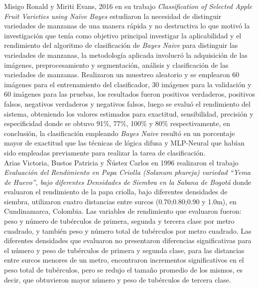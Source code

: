 Misigo Ronald y Miriti Evans, 2016 en su trabajo \textit{Classification of Selected Apple Fruit Varieties using Naïve Bayes} estudiaron la necesidad de distinguir variedades de manzanas de una manera rápida y no destructiva lo que motivó la investigación  que tenía como objetivo principal investigar la aplicabilidad y el rendimiento del algoritmo de clasificación de \textit{Bayes Naive} para distinguir las variedades de manzanas, la metodología aplicada involucró la adquisición de las imágenes, preprocesamiento y segmentación, análisis y clasificación de las variedades de manzanas. Realizaron un muestreo aleatorio y se emplearon 60 imágenes para el entrenamiento del clasificador, 30 imágenes para la validación y 60 imágenes para las pruebas, los resultados fueron positivos verdaderos, positivos falsos, negativos verdaderos y negativos falsos, luego se evaluó el rendimiento del sistema, obteniendo los valores estimados para exactitud, sensibilidad, precisión y especificidad donde se obtuvo 91\%, 77\%, 100\% y 80\% respectivamente, en conclusión, la clasificación empleando \textit{Bayes Naive} resultó en un porcentaje mayor de exactitud que las técnicas de lógica difusa y MLP-Neural que habían sido empleadas previamente para realizar la tarea de clasificación.\\

Arias Victoria, Bustos Patricia y Ñústez Carlos en 1996 realizaron el trabajo  \textit{Evaluación del Rendimiento en Papa Criolla (Solanum phureja) variedad "`Yema de Huevo"', bajo diferentes Densidades de Siembra en la Sabana de Bogotá} donde evaluaron el rendimiento de la papa criolla, bajo diferentes densidades de siembra, utilizaron cuatro distancias entre surcos (0.70;0.80;0.90 y 1.0m), en Cundinamarca, Colombia. Las variables de rendimiento que evaluaron fueron: peso y número de tubérculos de primera, segunda y tercera clase por metro cuadrado, y también peso y número total de tubérculos por metro cuadrado. Las diferentes densidades que evaluaron no presentaron diferencias significativas para el número y peso de tubérculos de primera y segunda clase, para las distancias entre surcos menores de un metro, encontraron incrementos significativos en el peso total de tubérculos, pero se redujo el tamaño promedio de los mismos, es decir, que obtuvieron mayor número y peso de tubérculos de tercera clase.\\

